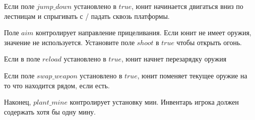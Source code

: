 Если поле $jump\_down$ установлено в $true$, юнит начинается двигаться вниз по лестницам и спрыгивать с / падать сквозь платформы.

Поле $aim$ контролирует направление прицеливания. Если юнит не имеет оружия, значение не используется.
Установите поле $shoot$ в $true$ чтобы открыть огонь.

Если в поле $reload$ установлено в $true$, юнит начнет перезарядку оружия

Если поле $swap\_weapon$ установлено в $true$, юнит поменяет текущее оружие на то что находится рядом, если есть.

Наконец, $plant\_mine$ контролирует установку мин. Инвентарь игрока должен содержать хотя бы одну мину.